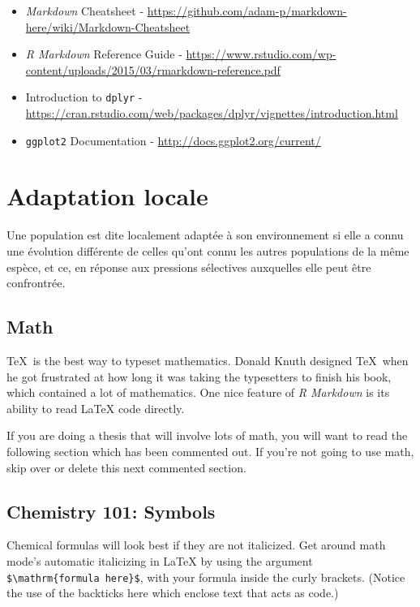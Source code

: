 \documentclass[12pt,twoside]{reedthesis}
\theoremstyle{definition}
\theoremstyle{definition}
\theoremstyle{remark}
\begin{document}
  \begin{itemize}
  \item
    \emph{Markdown} Cheatsheet -
    \url{https://github.com/adam-p/markdown-here/wiki/Markdown-Cheatsheet}
  \item
    \emph{R Markdown} Reference Guide -
    \url{https://www.rstudio.com/wp-content/uploads/2015/03/rmarkdown-reference.pdf}
  \item
    Introduction to \texttt{dplyr} -
    \url{https://cran.rstudio.com/web/packages/dplyr/vignettes/introduction.html}
  \item
    \texttt{ggplot2} Documentation -
    \url{http://docs.ggplot2.org/current/}
  \end{itemize}
  
  \chapter{Adaptation locale}\label{adaptation-locale}
  
  Une population est dite localement adaptée à son environnement si elle a
  connu une évolution différente de celles qu'ont connu les autres
  populations de la même espèce, et ce, en réponse aux pressions
  sélectives auxquelles elle peut être confrontrée.
  
  \hypertarget{math}{\section{Math}\label{math}}
  
  \TeX~is the best way to typeset mathematics. Donald Knuth designed
  \TeX~when he got frustrated at how long it was taking the typesetters to
  finish his book, which contained a lot of mathematics. One nice feature
  of \emph{R Markdown} is its ability to read LaTeX code directly.
  
  If you are doing a thesis that will involve lots of math, you will want
  to read the following section which has been commented out. If you're
  not going to use math, skip over or delete this next commented section.
  
  \section{Chemistry 101: Symbols}\label{chemistry-101-symbols}
  
  Chemical formulas will look best if they are not italicized. Get around
  math mode's automatic italicizing in LaTeX by using the argument
  \texttt{\$\textbackslash{}mathrm\{formula\ here\}\$}, with your formula
  inside the curly brackets. (Notice the use of the backticks here which
  enclose text that acts as code.)
  
\end{document}
